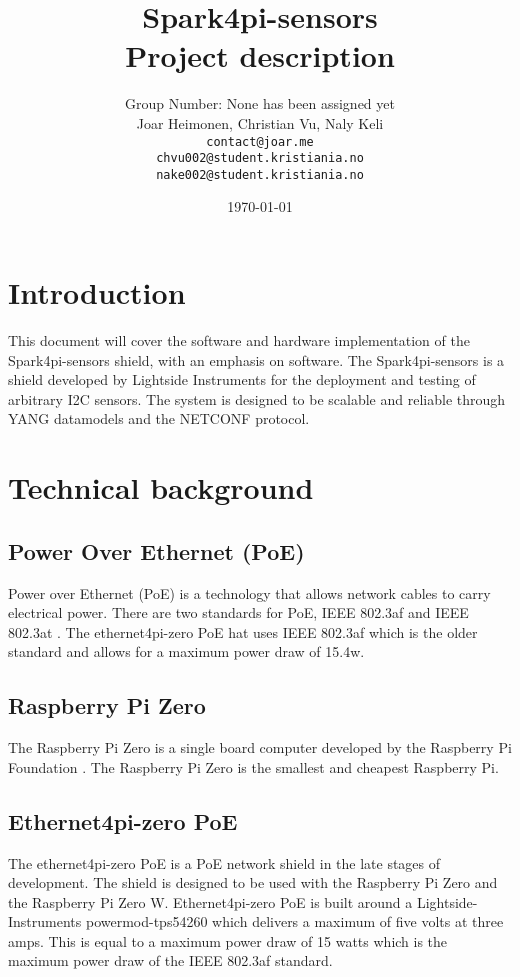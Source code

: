 \documentclass[12pt]{article}
\author{
    Group Number: None has been assigned yet\\
    Joar Heimonen, Christian Vu, Naly Keli \\
    \texttt{contact@joar.me}\\ 
    \texttt{chvu002@student.kristiania.no}\\
    \texttt{nake002@student.kristiania.no}
}
\title{
    \textbf{Spark4pi-sensors}\\[0.5em]
    \large Project description
}
\date{\today}
\begin{document}
\maketitle
\pagebreak

\tableofcontents

\pagebreak


\section{Introduction}
This document will cover the software and hardware implementation of the Spark4pi-sensors shield, with an emphasis
on software. The Spark4pi-sensors is a shield developed by Lightside Instruments for the deployment and testing of arbitrary I2C sensors.
The system is designed to be scalable and reliable through YANG datamodels and the NETCONF protocol.

\section{Technical background}
\subsection{Power Over Ethernet (PoE)}
Power over Ethernet (PoE) is a technology that allows network cables to carry electrical power. 
There are two standards for PoE, IEEE 802.3af and IEEE 802.3at \cite{IEEEStandardsAssociation}. The ethernet4pi-zero PoE hat uses IEEE 802.3af which 
is the older standard and allows for a maximum power draw of 15.4w.

\subsection{Raspberry Pi Zero}
The Raspberry Pi Zero is a single board computer developed by the Raspberry Pi Foundation \cite{foundationTeachLearnMake2025}. 
The Raspberry Pi Zero is the smallest and cheapest Raspberry Pi.

\subsection{Ethernet4pi-zero PoE}
The ethernet4pi-zero PoE is a PoE network shield in the late stages of development.
The shield is designed to be used with the Raspberry Pi Zero and the Raspberry Pi Zero W.
Ethernet4pi-zero PoE is built around a Lightside-Instruments powermod-tps54260 which delivers a maximum of five volts at three amps.
This is equal to a maximum power draw of 15 watts which is the maximum power draw of the IEEE 802.3af standard.
\end{document}
